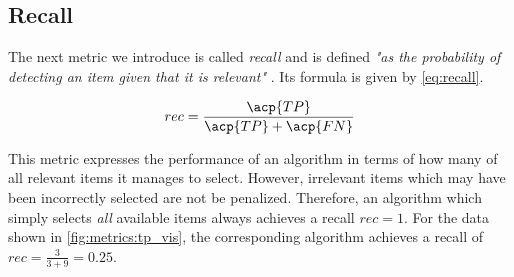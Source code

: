 \subsection{Recall}
\label{chp:fundamentals:sec:metrics:subsec:Recall}

The next metric we introduce is called \textit{recall} and is defined \textit{"as the probability of detecting an item given that it is relevant"} \parencite{Zhu:2004}.
Its formula is given by \cref{eq:recall}.

\begin{equation}\label{eq:recall}
    rec = \frac{\acp{TP}}{\acp{TP}+\acp{FN}}
\end{equation}

This metric expresses the performance of an algorithm in terms of how many of all relevant items it manages to select.
However, irrelevant items which may have been incorrectly selected are not be penalized.
Therefore, an algorithm which simply selects \textit{all} available items always achieves a recall $rec=1$.
For the data shown in \cref{fig:metrics:tp_vis}, the corresponding algorithm achieves a recall of $rec = \frac{3}{3+9} = 0.25$.
